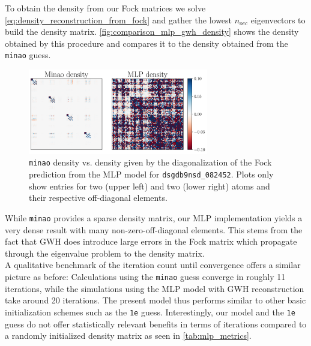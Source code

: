 To obtain the density from our Fock matrices we solve \autoref{eq:density_reconstruction_from_fock} and gather the lowest $n_{occ}$ eigenvectors to build the density matrix. \autoref{fig:comparison_mlp_gwh_density} shows the density obtained by this procedure and compares it to the density obtained from the \texttt{minao} guess.
\begin{figure}[H]
    \centering
    \includegraphics[width=0.7\textwidth]{../fig/mlp_further_trials/minao_vs_pred.pdf}
    \caption[\texttt{minao} vs. MLP density]{\texttt{minao} density vs. density given by the diagonalization of the Fock prediction from the MLP model for \texttt{dsgdb9nsd\_082452}. Plots only show entries for two  (upper left) and two  (lower right) atoms and their respective off-diagonal elements.}
    \label{fig:comparison_mlp_gwh_density}
\end{figure}
While \texttt{minao} provides a sparse density matrix, our MLP implementation yields a very dense result with many non-zero-off-diagonal elements. This stems from the fact that GWH does introduce large errors in the Fock matrix which propagate through the eigenvalue problem to the density matrix. \\
A qualitative benchmark of the iteration count until convergence offers a similar picture as before: Calculations using the \texttt{minao} guess converge in roughly 11 iterations, while the simulations using the MLP model with GWH reconstruction take around 20 iterations. The present model thus performs similar to other basic initialization schemes such as the \texttt{1e} guess. Interestingly, our model and the \texttt{1e} guess do not offer statistically relevant benefits in terms of iterations compared to a randomly initialized density matrix as seen in \autoref{tab:mlp_metrics}.

